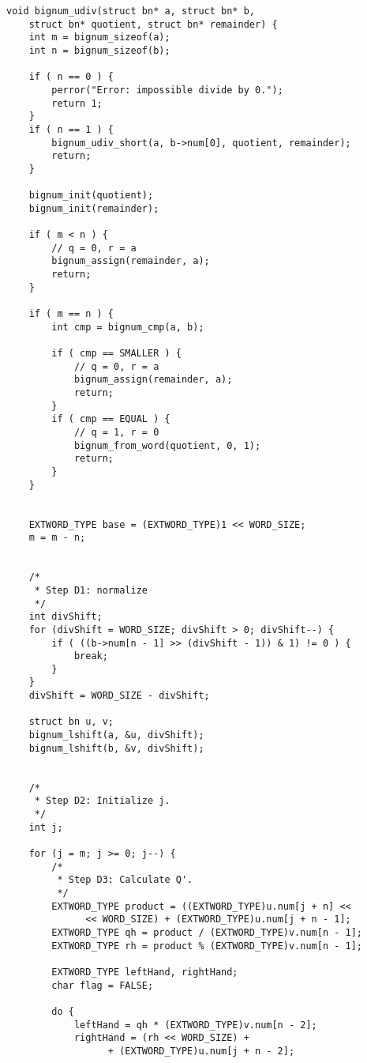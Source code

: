 \begin{lstlisting}[basicstyle=\ttfamily\small, backgroundcolor=\color{bgCode}]
void bignum_udiv(struct bn* a, struct bn* b,
    struct bn* quotient, struct bn* remainder) {
    int m = bignum_sizeof(a);
    int n = bignum_sizeof(b);
    
    if ( n == 0 ) {
        perror("Error: impossible divide by 0.");
        return 1;
    }
    if ( n == 1 ) {
        bignum_udiv_short(a, b->num[0], quotient, remainder);
        return;
    }
    
    bignum_init(quotient);
    bignum_init(remainder);
    
    if ( m < n ) {
        // q = 0, r = a
        bignum_assign(remainder, a);
        return;
    }
    
    if ( m == n ) {
        int cmp = bignum_cmp(a, b);
        
        if ( cmp == SMALLER ) {
            // q = 0, r = a
            bignum_assign(remainder, a);
            return;
        }
        if ( cmp == EQUAL ) {
            // q = 1, r = 0
            bignum_from_word(quotient, 0, 1);
            return;
        }
    }
    
    
    EXTWORD_TYPE base = (EXTWORD_TYPE)1 << WORD_SIZE;
    m = m - n;
    
    
    /*
     * Step D1: normalize
     */
    int divShift;
    for (divShift = WORD_SIZE; divShift > 0; divShift--) {
        if ( ((b->num[n - 1] >> (divShift - 1)) & 1) != 0 ) {
            break;
        }
    }
    divShift = WORD_SIZE - divShift;
    
    struct bn u, v;
    bignum_lshift(a, &u, divShift);
    bignum_lshift(b, &v, divShift);
    
    
    /*
     * Step D2: Initialize j.
     */
    int j;
    
    for (j = m; j >= 0; j--) {
        /*
         * Step D3: Calculate Q'.
         */
        EXTWORD_TYPE product = ((EXTWORD_TYPE)u.num[j + n] <<
              << WORD_SIZE) + (EXTWORD_TYPE)u.num[j + n - 1];
        EXTWORD_TYPE qh = product / (EXTWORD_TYPE)v.num[n - 1];
        EXTWORD_TYPE rh = product % (EXTWORD_TYPE)v.num[n - 1];
        
        EXTWORD_TYPE leftHand, rightHand;
        char flag = FALSE;
        
        do {
            leftHand = qh * (EXTWORD_TYPE)v.num[n - 2];
            rightHand = (rh << WORD_SIZE) +
                  + (EXTWORD_TYPE)u.num[j + n - 2];
            

\end{lstlisting}
